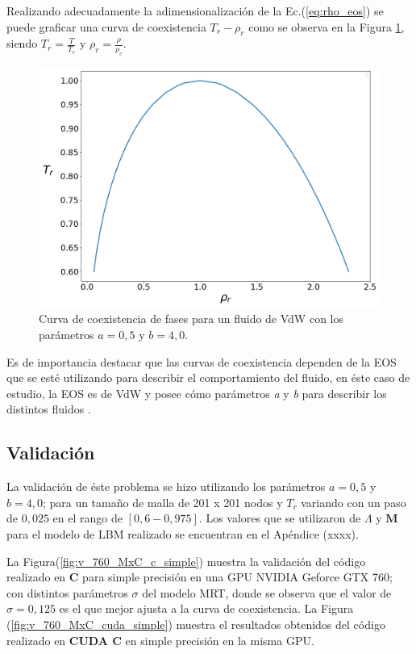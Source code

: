 Realizando adecuadamente la adimensionalización  de la Ec.(\ref{eq:rho_eos}) se puede graficar una curva de coexistencia $T_r - \rho_r$  como se observa en la Figura \ref{fig:T_r_rho_r_analitico}, siendo $T_r = \frac{T}{T_c}$ y $\rho_r = \frac{\rho}{\rho_c}$.

\begin{figure}[h!]
	\centering
	\includegraphics[width=.8\textwidth]{figs/cap4/Diagrama_T_r_vs_rho_r_analitico}
	\caption{Curva de coexistencia de fases para un fluido de VdW con los parámetros $a = 0,5 $ y $b = 4,0 $.}
	\label{fig:T_r_rho_r_analitico}	
\end{figure}

\newpage
Es de importancia destacar que las curvas de coexistencia dependen de la EOS que se esté utilizando para describir el comportamiento del fluido, en éste caso de estudio, la EOS es de VdW y posee  cómo parámetros \textit{a} y \textit{b} para describir los distintos fluidos .

\subsection{Validación}

La validación de éste problema se hizo utilizando los parámetros $a =0,5$ y $b = 4,0$; para un tamaño de malla de 201 x 201 nodos y $T_r$ variando con un paso de $0,025$ en el rango de $[0,6 - 0,975]$.  Los valores que se utilizaron de $\Lambda$ y $\mathbf{M}$ para el modelo de LBM realizado se encuentran en el Apéndice (xxxx).

La Figura(\ref{fig:v_760_MxC_c_simple}) muestra la validación del código realizado en \textbf{C} para simple precisión en una GPU NVIDIA Geforce GTX 760; con distintos parámetros $\sigma$ del modelo MRT, donde se observa que el valor de $\sigma = 0,125$ es el que mejor ajusta a la curva de coexistencia. La Figura (\ref{fig:v_760_MxC_cuda_simple}) muestra el resultados obtenidos del código realizado en \textbf{CUDA C} en simple precisión en la misma GPU.

